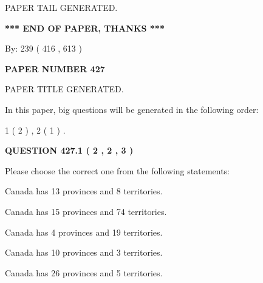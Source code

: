 \documentclass[12pt]{article}
\begin{document}
   
   
\vspace{2.0in} PAPER TAIL GENERATED.
   
   
   
   
\vspace{1.0in} 
{\textbf{\large{ *** END OF PAPER, THANKS *** }}} 
   
   
\hspace{1.0in} By: 
 239 ( 416 ,  613 )
   
   
   
   
\newpage 
\setcounter{page}{ 
   427001 } 
   
   
   
   
 {\textbf{ \Large{ PAPER NUMBER  427  }}}
   
   
\vspace{0.2in}
   
   
   
   
   
   
   
   
 \vspace{0.2in}
 
 
 
 
   
   
 PAPER TITLE GENERATED.
   
   
   
\vspace{0.2in}
   
In this paper, big questions will be generated in the following order: 
   
   
   1 ( 2 )
 ,
   2 ( 1 )
 .
  
\vspace{0.2in}
  
{\textbf{\Large{QUESTION
427.1 
 ( 2 , 2 , 3 )
}}}
  
  
Please choose the correct one from the following statements:
 
 
Canada has  13 provinces and  8 territories.
 
 
Canada has  15 provinces and  74 territories.
 
 
Canada has   4 provinces and  19 territories.
 
 
Canada has 10  provinces and 3 territories.
 
 
Canada has  26 provinces and  5 territories.
 
\end{document}
